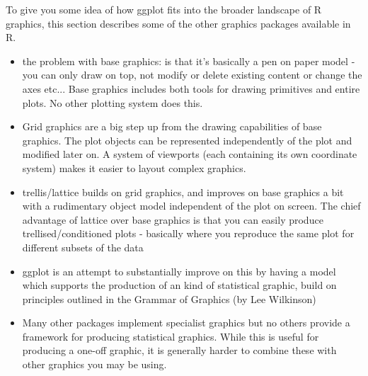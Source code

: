 To give you some idea of how ggplot fits into the broader landscape of R graphics, this section describes some of the other graphics packages available in R.

\begin{itemize}
	\item  the problem with base graphics: is that it's basically a pen on
	paper model - you can only draw on top, not modify or delete existing
	content or change the axes etc...  Base graphics includes both tools for drawing primitives and entire plots.  No other plotting system does this.

	\item Grid graphics are a big step up from the drawing capabilities of base graphics.  The plot objects can be represented independently of the plot and modified later on.  A system of viewports (each containing its own coordinate system) makes it easier to layout complex graphics.  

	\item trellis/lattice builds on grid graphics, and improves on base graphics a bit with a rudimentary object
	model independent of the plot on screen.  The chief advantage of
	lattice over base graphics is that you can easily produce
	trellised/conditioned plots - basically where you reproduce the same
	plot for different subsets of the data

	\item ggplot is an attempt to substantially improve on this by having a
	model which supports the production of an kind of statistical graphic,
	build on principles outlined in the Grammar of Graphics (by Lee
	Wilkinson)

	\item Many other packages implement specialist graphics but no others provide a framework for producing statistical graphics.  While this is useful for producing a one-off graphic, it is generally harder to combine these with other graphics you may be using.  

\end{itemize}

\wholefalse

